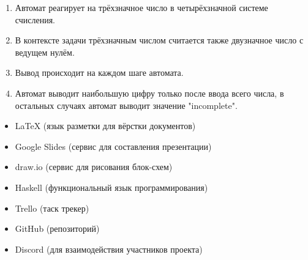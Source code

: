 

\begin{enumerate}

    \item Автомат реагирует на трёхзначное число в четырёхзначной системе
        счисления.

    \item В контексте задачи трёхзначным числом считается также
        двузначное число с ведущем нулём.

    \item Вывод происходит на каждом шаге автомата.

    \item Автомат выводит наибольшую цифру только после ввода всего
        числа, в остальных случаях автомат выводит значение "incomplete".

\end{enumerate}




\begin{itemize}

    \item LaTeX (язык разметки для вёрстки документов)

    \item Google Slides (сервис для составления презентации)

    \item draw.io (сервис для рисования блок-схем)

    \item Haskell (функциональный язык программирования)

    \item Trello (таск трекер)

    \item GitHub (репозиторий)

    \item Discord (для взаимодействия участников проекта)

\end{itemize}

